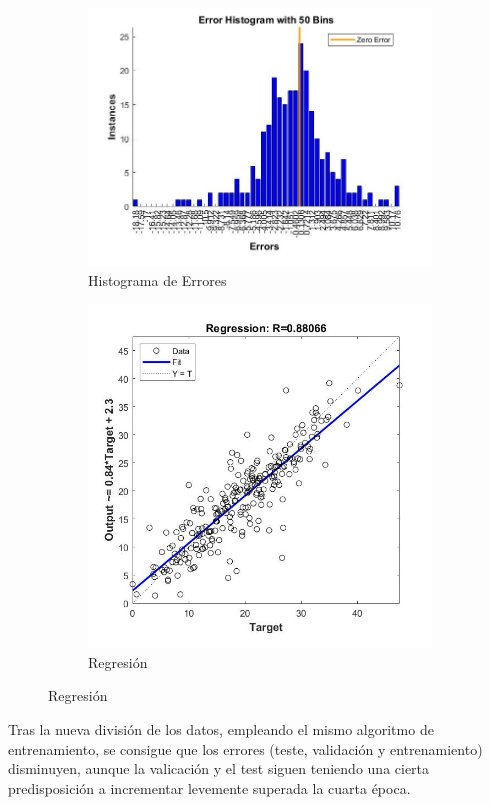 \documentclass{article}
\begin{document}
\begin{figure}[H]
\begin{subfigure}{0.4\textwidth}
  \includegraphics[width=0.8\linewidth]{../images/I_ex3_errorhistogram_bodyfat_dataset_div60-20-20.jpg}
  \caption{Histograma de Errores}
 \end{subfigure}
 \begin{subfigure}{0.4\textwidth}
  \includegraphics[width=0.8\linewidth]{../images/I_ex3_regression_bodyfat_dataset_div60-20-20.jpg}
  \caption{Regresión}
 \end{subfigure}
\end{figure}

Tras la nueva división de los datos, empleando el mismo algoritmo de
entrenamiento, se consigue que los errores (teste, validación y entrenamiento)
disminuyen, aunque la valicación y el test siguen teniendo una cierta
predisposición a incrementar levemente superada la cuarta época. 
\end{document}
